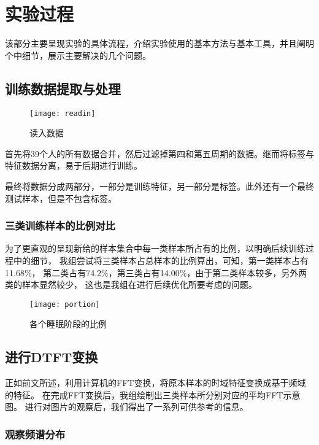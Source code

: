 \section{实验过程}

该部分主要呈现实验的具体流程，介绍实验使用的基本方法与基本工具，并且阐明个中细节，展示主要解决的几个问题。

\subsection{训练数据提取与处理}

\begin{figure}[ht]
	\centering
	\texttt{[image: readin]}
	\caption{读入数据}
	\label{fig:readin}
\end{figure}

首先将39个人的所有数据合并，然后过滤掉第四和第五周期的数据。继而将标签与特征数据分离，易于后期进行训练。

最终将数据分成两部分，一部分是训练特征，另一部分是标签。此外还有一个最终测试样本，但是不包含标签。

\subsubsection{三类训练样本的比例对比}

为了更直观的呈现新给的样本集合中每一类样本所占有的比例，以明确后续训练过程中的细节，
我组尝试将三类样本占总样本的比例算出，可知，第一类样本占有11.68\%，
第二类占有74.2\%，第三类占有14.00\%，由于第二类样本较多，另外两类的样本显然较少，
这也是我组在进行后续优化所要考虑的问题。

\begin{figure}[ht]
	\centering
	\texttt{[image: portion]}
	\caption{各个睡眠阶段的比例}
	\label{fig:portion}
\end{figure}

\subsection{进行DTFT变换}

正如前文所述，利用计算机的FFT变换，将原本样本的时域特征变换成基于频域的特征。
在完成FFT变换后，我组绘制出三类样本所分别对应的平均FFT示意图。
进行对图片的观察后，我们得出了一系列可供参考的信息。

\subsubsection{观察频谱分布}

